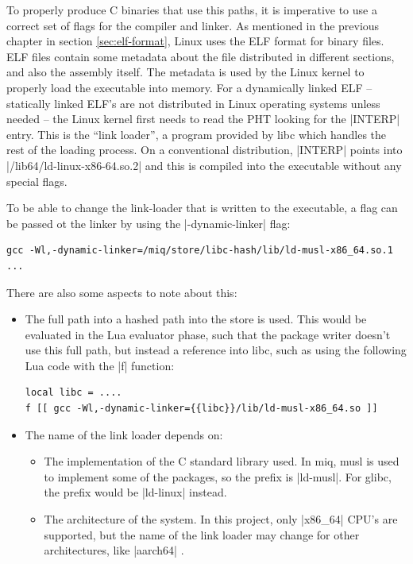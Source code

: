 To properly produce C binaries that use this paths, it is
imperative to use a correct set of flags for the compiler
and linker. As mentioned in the previous chapter in section
\ref{sec:elf-format}, Linux uses the \acl{ELF} format for
binary files. \ac{ELF} files contain some metadata about the
file distributed in different sections, and also the
assembly itself. The metadata is used by the Linux kernel to
properly load the executable into memory. For a dynamically
linked \ac{ELF} -- statically linked \ac{ELF}'s are not
distributed in Linux operating systems unless needed -- the
Linux kernel first needs to read the \acl{PHT} looking for
the |INTERP| entry. This is the ``link loader'', a program
provided by libc which handles the rest of the loading
process. On a conventional distribution, |INTERP| points
into |/lib64/ld-linux-x86-64.so.2| and this is compiled into
the executable without any special flags.

To be able to change the link-loader that is written to the
executable, a flag \cite{GNUCompilerCollection} can be
passed ot the linker by using the |-dynamic-linker| flag:

\begin{verbatim}
gcc -Wl,-dynamic-linker=/miq/store/libc-hash/lib/ld-musl-x86_64.so.1 ...
\end{verbatim}

There are also some aspects to note about this:

\begin{itemize}
    \item The full path into a hashed path into the store is
    used. This would be evaluated in the Lua evaluator
    phase, such that the package writer doesn't use this
    full path, but instead a reference into libc, such as
    using the following Lua code with the |f| function:
\begin{verbatim}
local libc = ....
f [[ gcc -Wl,-dynamic-linker={{libc}}/lib/ld-musl-x86_64.so ]]
\end{verbatim}

    \item The name of the link loader depends on:
    \begin{itemize}
        \item The implementation of the C standard library
        used. In miq, musl is used to implement some of the
        packages, so the prefix is |ld-musl|. For glibc, the
        prefix would be |ld-linux| instead.

        \item The architecture of the system. In this
        project, only |x86_64| CPU's are supported, but the
        name of the link loader may change for other
        architectures, like |aarch64| .
    \end{itemize}
\end{itemize}


